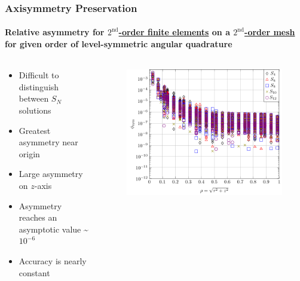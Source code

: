 \documentclass[compress,t]{beamer}
\begin{document}
\begin{frame}[t]
\frametitle{Axisymmetry Preservation}
\framesubtitle{Relative asymmetry for \underline{$2^\text{nd}$-order finite elements} on a \underline{$2^\text{nd}$-order mesh} for given order of level-symmetric angular quadrature}

\begin{columns}[T]

\begin{column}{0.4\textwidth}
\begin{itemize}
\item{Difficult to distinguish between $S_N$ solutions}
\item{Greatest asymmetry near origin}
\item{Large asymmetry on $z$-axis}
\item{Asymmetry reaches an asymptotic value \textasciitilde$10^{-6}$}
\item{Accuracy is nearly constant}
\end{itemize}

\end{column}

\begin{column}{0.6\textwidth}
\begin{figure}
\flushright
\includegraphics[scale=0.6]{./graphics/RZASMMSLinearRhoBrunnerp2g2r2.pdf}
\end{figure}

\end{column}

\end{columns}

\end{frame}
\end{document}
